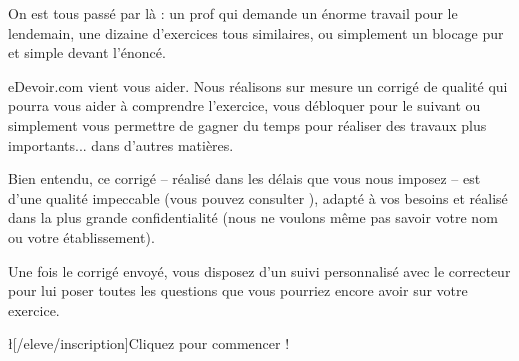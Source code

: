 On est tous passé par là : un prof qui demande un énorme travail pour le lendemain, une dizaine d'exercices tous similaires, ou simplement un blocage pur et simple devant l'énoncé.

eDevoir.com vient vous aider. Nous réalisons sur mesure un corrigé de qualité qui pourra vous aider à comprendre l'exercice, vous débloquer pour le suivant ou simplement vous permettre de gagner du temps pour réaliser des travaux plus importants... dans d'autres matières.

Bien entendu, ce corrigé -- réalisé dans les délais que vous nous imposez -- est d'une qualité impeccable (vous pouvez consulter ), adapté à vos besoins et réalisé dans la plus grande confidentialité (nous ne voulons même pas savoir votre nom ou votre établissement).

Une fois le corrigé envoyé, vous disposez d'un suivi personnalisé avec le correcteur pour lui poser toutes les questions que vous pourriez encore avoir sur votre exercice.

\l[/eleve/inscription]{Cliquez pour commencer !}